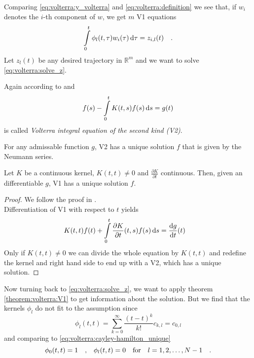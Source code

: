 Comparing \eqref{eq:volterra:y_volterra} and 
\eqref{eq:volterra:definition}
we see that, if $w_i$ denotes the $i$-th component of $w$, we get $m$ 
V1 equations
\begin{equation}
\int\limits_0^t \phi_l(t,\tau) w_i(\tau) \, \text{d}\tau = z_{i,l}(t) \quad 
.
\label{eq:volterra:solve_z}
\end{equation}
Let $z_l(t)$ be any desired trajectory in $\mathbb{R}^m$ and we want to solve 
\eqref{eq:volterra:solve_z}. 

\begin{definition}
Again according to \cite{Heuser} and \cite{Kirsch}
\begin{equation}
f(s)-\int\limits_0^t K(t,s) f(s) \, \text{d} s = g(t)
\end{equation}
is called \textit{Volterra integral equation of the second kind (V2)}.
\end{definition}
\begin{theorem}
For any admissable function $g$, V2 has a uni\-que solution $f$ that is given by the 
Neumann series.
\end{theorem}
\begin{theorem}\label{theorem:volterra:V1}
Let $K$ be a continuous kernel, $K(t,t)\neq 0$ and 
$\frac{\partial K}{\partial t}$ continuous. Then, given an differentiable $g$, V1 has a 
unique solution $f$.
\end{theorem}
\begin{proof}
We follow the proof in \cite{Kirsch}.\\
Differentiation of V1 with respect to $t$ yields
\begin{equation}
K(t,t)f(t) + \int\limits_0^t \frac{\partial K}{\partial t}(t,s) f(s) \, \text{d} s = \frac{\text{d} 
g}{\text{d} t}(t) \quad
\end{equation}
Only if $K(t,t)\neq 0$ we can divide the whole equation by $K(t,t)$ and redefine the 
kernel and right hand side to end up with a V2, which has a unique solution.
\end{proof}

Now turning back to \eqref{eq:volterra:solve_z}, we want to apply theorem 
\ref{theorem:volterra:V1} to get information about the solution. But we find that 
the kernels $\phi_l$ do not fit to the assumption since
\begin{equation}
\phi_l(t,t) = \sum\limits_{k=0}^\infty \frac{(t-t)^k}{k!} c_{k,l} = c_{0,l}
\end{equation}
and comparing to \eqref{eq:volterra:cayley-hamilton_unique} 
\begin{equation}
\phi_0(t,t) = 1 \quad \text{,} \quad \phi_l (t,t) = 0 \quad \text{for} \quad l=1,2,\ldots,N-1 \quad .
\label{eq:volterra:phi_zeroes}
\end{equation}

